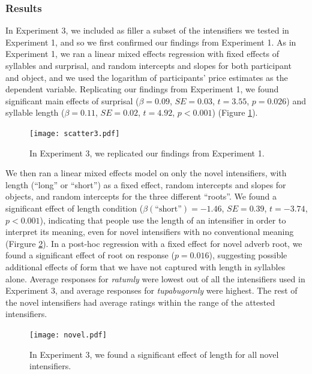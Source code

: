 \documentclass[10pt,letterpaper]{article}
\newcommand{\w}[1]{\emph{#1}}
\begin{document}
\subsubsection{Results}
In Experiment 3, we included as filler a subset of the intensifiers we tested in Experiment 1, and so we first confirmed our findings from Experiment 1. As in Experiment 1, we ran a linear mixed effects regression with fixed effects of syllables and surprisal, and random intercepts and slopes for both participant and object, and we used the logarithm of participants' price estimates as the dependent variable. Replicating our findings from Experiment 1, we found significant main effects of surprisal ($\beta=0.09$, $SE=0.03$, $t=3.55$, $p=0.026$) and syllable length ($\beta=0.11$, $SE=0.02$, $t=4.92$, $p<0.001$) (Figure \ref{exp3_replication}).

\begin{figure}[hbt]
\begin{center}
\texttt{[image: scatter3.pdf]}
\end{center}
\caption{In Experiment 3, we replicated our findings from Experiment 1.} 
\label{exp3_replication}
\end{figure}

We then ran a linear mixed effects model on only the novel intensifiers, with length (``long'' or ``short'') as a fixed effect, random intercepts and slopes for objects, and random intercepts for the three different ``roots''. We found a significant effect of length condition ($\beta(\mbox{``short''})=-1.46$, $SE=0.39$, $t=-3.74$, $p<0.001$), indicating that people use the length of an intensifier in order to interpret its meaning, even for novel intensifiers with no conventional meaning (Firgure \ref{exp3_novel}).
In a post-hoc regression with a fixed effect for novel adverb root, we found a significant effect of root on response ($p=0.016$), suggesting possible additional effects of form that we have not captured with length in syllables alone. Average responses for \w{ratumly} were lowest out of all the intensifiers used in Experiment 3, and average responses for \w{tupabugornly} were highest. The rest of the novel intensifiers had average ratings within the range of the attested intensifiers.

\begin{figure}[hbt]
\begin{center}
\texttt{[image: novel.pdf]}
\end{center}
\caption{In Experiment 3, we found a significant effect of length for all novel intensifiers.} 
\label{exp3_novel}
\end{figure}
\end{document}
